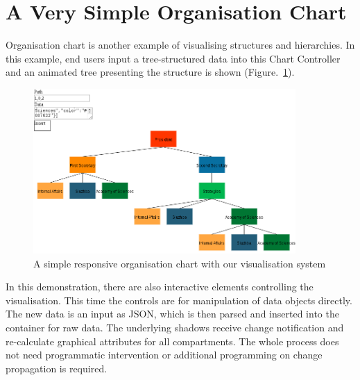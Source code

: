 \documentclass[11pt, a4paper]{report}
\begin{document}
\section{A Very Simple Organisation Chart}
Organisation chart is another example of visualising structures and hierarchies. In this example, end users input a tree-structured data into this Chart Controller and an animated tree presenting the structure is shown (Figure.~\ref{fig:org_chart_vis}).
\begin{figure}[f]
\centering
\includegraphics[width=10cm]{fig6_org_chart_vis}
\caption{A simple responsive organisation chart with our visualisation system}
\label{fig:org_chart_vis}
\end{figure}
In this demonstration, there are also interactive elements controlling the visualisation. This time the controls are for manipulation of data objects directly. The new data is an input as JSON, which is then parsed and inserted into the container for raw data. The underlying shadows receive change notification and re-calculate graphical attributes for all compartments. The whole process does not need programmatic intervention or additional programming on change propagation is required.


\end{document}
